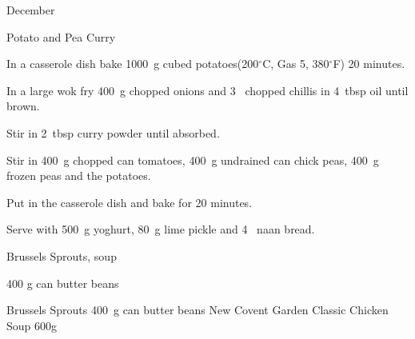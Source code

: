 \begin{menu}{December}
\begin{recipe}{2}{Potato and Pea Curry}
    \begin{instructions}
    \item 
        In a casserole dish bake 
        1000~g cubed potatoes(200$^{\circ}$C, Gas 5, 380$^{\circ}$F) 20 minutes.
      \item 
        In a large wok fry
        400~g chopped onions
        and
        3~ chopped chillis
        in
        4~tbsp  oil
        until brown.
      \item 
        Stir in
        2~tbsp  curry powder
        until absorbed.
      \item 
        Stir in
        400~g chopped can tomatoes,
        400~g undrained can chick peas,
        400~g  frozen peas
        and the potatoes.
      \item 
        Put in the casserole dish
        and bake for 20 minutes.
      \item 
        Serve with
        500~g  yoghurt,
        80~g  lime pickle
        and
        4~  naan bread.
      
    \end{instructions}
    \end{recipe}%
  
    \begin{recipe}{1}{Brussels Sprouts, soup}%
		\begin{ingredients}
		400 g can butter beans  \\
	
		\end{ingredients}
	
	
    \begin{instructions}
    \item 
      Brussels Sprouts
      400~g  can butter beans
      New Covent Garden Classic Chicken Soup 600g
      
    \end{instructions}
    \end{recipe}%
  
    \clearpage
    \end{menu}
	
	